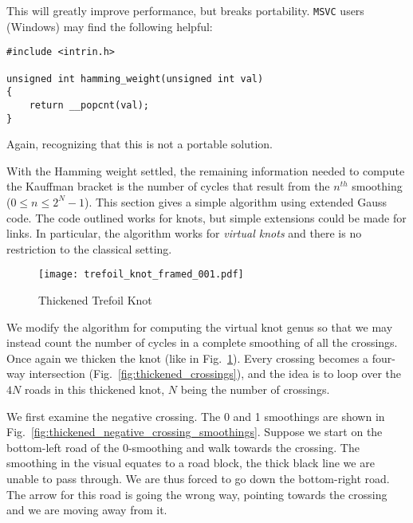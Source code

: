         This will greatly improve performance, but breaks portability.
        \texttt{MSVC} users (Windows) may find the following helpful:
\begin{lstlisting}[style=CStyle]
#include <intrin.h>

unsigned int hamming_weight(unsigned int val)
{
    return __popcnt(val);
}
\end{lstlisting}
        Again, recognizing that this is not a portable solution.
        \par\hfill\par
        With the Hamming weight settled, the remaining information needed to
        compute the Kauffman bracket is the number of cycles that result from
        the $n^{th}$ smoothing ($0\leq{n}\leq{2}^{N}-1$). This section gives a
        simple algorithm using extended Gauss code. The code outlined works for
        knots, but simple extensions could be made for links. In particular, the
        algorithm works for \textit{virtual knots} and there is no restriction
        to the classical setting.
        \par\hfill\par
        \begin{figure}
            \centering
            \texttt{[image: trefoil\_knot\_framed\_001.pdf]}
            \caption{Thickened Trefoil Knot}
            \label{fig:trefoil_knot_framed_001}
        \end{figure}
        We modify the algorithm for computing the virtual knot genus so that we
        may instead count the number of cycles in a complete smoothing of all
        the crossings. Once again we thicken the knot
        (like in Fig.~\ref{fig:trefoil_knot_framed_001}). Every
        crossing becomes a four-way intersection
        (Fig.~\ref{fig:thickened_crossings}), and the idea is to loop
        over the $4N$ roads in this thickened knot, $N$ being the number of
        crossings.
        \par\hfill\par
        We first examine the negative crossing. The 0 and 1
        smoothings are shown in
        Fig.~\ref{fig:thickened_negative_crossing_smoothings}. Suppose we start
        on the bottom-left road of the 0-smoothing and walk towards the
        crossing. The smoothing in the visual equates to a road block, the thick
        black line we are unable to pass through. We are thus forced to go down
        the bottom-right road. The arrow for this road is going the wrong way,
        pointing towards the crossing and we are moving away from it.
